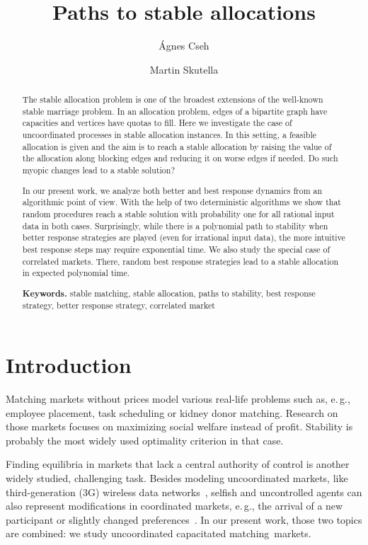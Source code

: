 \documentclass{llncs}
\newcommand{\eg}{{e.\,g.}}
\begin{document}
\title{Paths to stable allocations}
\author{\'{A}gnes Cseh \and Martin Skutella}

\maketitle

\begin{abstract}
The stable allocation problem is one of the broadest extensions of the well-known stable marriage problem. In an allocation problem, edges of a bipartite graph have capacities and vertices have quotas to fill. Here we investigate the case of uncoordinated processes in stable allocation instances. In this setting, a feasible allocation is given and the aim is to reach a stable allocation by raising the value of the allocation along blocking edges and reducing it on worse edges if needed. Do such myopic changes lead to a stable solution?

In our present work, we analyze both better and best response dynamics from an algorithmic point of view. With the help of two deterministic algorithms we show that random procedures reach a stable solution with probability one for all rational input data in both cases. Surprisingly, while there is a polynomial path to stability when better response strategies are played (even for irrational input data), the more intuitive best response steps may require exponential time. We also study the special case of correlated markets. There, random best response strategies lead to a stable allocation in expected polynomial time.

\smallskip
\noindent \textbf{Keywords.} stable matching, stable allocation, paths to stability, best response strategy, better response strategy, correlated market
\end{abstract}

\section{Introduction}

Matching markets without prices model various real-life problems such as, \eg, employee placement, task scheduling or kidney donor matching. Research on those markets focuses on maximizing social welfare instead of profit. Stability is probably the most widely used optimality criterion in that case. 

Finding equilibria in markets that lack a central authority of control is another widely studied, challenging task. Besides modeling uncoordinated markets, like third-generation (3G) wireless data networks~\cite{GLM06}, selfish and uncontrolled agents can also represent modifications in coordinated markets, \eg, the arrival of a new participant or slightly changed preferences~\cite{BRR97}. In our present work, those two topics are combined: we study uncoordinated capacitated matching~markets.
\end{document}
